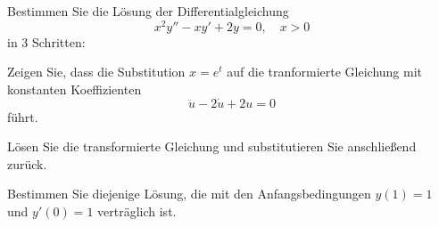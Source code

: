 \begin{atiTask}[
  title = Eulersche Differentialgleichung (unfertig)
]
Bestimmen Sie die Lösung der Differentialgleichung
\begin{equation*}
x^2y''-xy'+2y=0,\quad x>0
\end{equation*}
in 3 Schritten:
\begin{atiSubtasks}
\item Zeigen Sie, dass die Substitution $x=e^t$ auf die tranformierte Gleichung mit konstanten Koeffizienten
\begin{equation*}
\ddot{u}-2\dot{u}+2u=0
\end{equation*}
führt.
\item Lösen Sie die transformierte Gleichung und substitutieren Sie anschließend zurück.
\item Bestimmen Sie diejenige Lösung, die mit den Anfangsbedingungen $y(1)=1$ und $y'(0)=1$ verträglich ist.
\end{atiSubtasks}
\end{atiTask}
